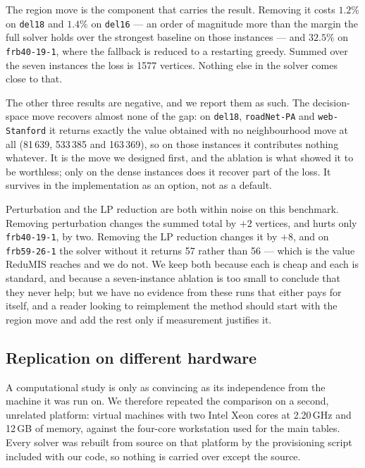 \documentclass[preprint,12pt]{elsarticle}
\theoremstyle{definition}
\begin{document}
The region move is the component that carries the result. Removing it costs
$1.2\%$ on \texttt{del18} and $1.4\%$ on \texttt{del16} --- an order of magnitude
more than the margin the full solver holds over the strongest baseline on those
instances --- and $32.5\%$ on \texttt{frb40-19-1}, where the fallback is reduced
to a restarting greedy. Summed over the seven instances the loss is 1577
vertices. Nothing else in the solver comes close to that.

The other three results are negative, and we report them as such. The
decision-space move recovers almost none of the gap: on \texttt{del18},
\texttt{roadNet-PA} and \texttt{web-Stanford} it returns exactly the value
obtained with no neighbourhood move at all (81\,639, 533\,385 and 163\,369), so
on those instances it contributes nothing whatever. It is the move we designed
first, and the ablation is what showed it to be worthless; only on the dense
instances does it recover part of the loss. It survives in the implementation
as an option, not as a default.

Perturbation and the LP reduction are both within noise on this benchmark.
Removing perturbation changes the summed total by $+2$ vertices, and hurts only
\texttt{frb40-19-1}, by two. Removing the LP reduction changes it by $+8$, and
on \texttt{frb59-26-1} the solver without it returns 57 rather than 56 --- which
is the value ReduMIS reaches and we do not. We keep both because each is cheap
and each is standard, and because a seven-instance ablation is too small to
conclude that they never help; but we have no evidence from these runs that
either pays for itself, and a reader looking to reimplement the method should
start with the region move and add the rest only if measurement justifies it.

\subsection{Replication on different hardware}
\label{sec:replication}

A computational study is only as convincing as its independence from the machine
it was run on. We therefore repeated the comparison on a second, unrelated
platform: virtual machines with two Intel Xeon cores at 2.20\,GHz and 12\,GB of
memory, against the four-core workstation used for the main tables. Every solver
was rebuilt from source on that platform by the provisioning script included
with our code, so nothing is carried over except the source.
\end{document}
